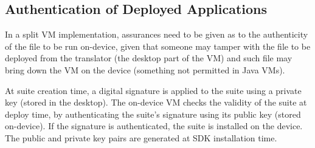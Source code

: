 \documentclass{sigplanconf}
\newcommand{\doublecenterfigbegin}{\begin{figure*}[htp] \begin{center}}
\newcommand{\doublecenterfigend}[2]{{\caption{\label{#1} {#2}}} \end{center} \end{figure*} }
\begin{document}
%
%
%        
%


\subsection{Authentication of Deployed Applications}
\label{sec-authentication}

In a split VM implementation, assurances need to be given 
as to the authenticity of the file to be run on-device, 
given that someone may tamper with the file to be deployed
from the translator (the desktop part of the VM) and such 
file may bring down the VM on the device (something not 
permitted in Java VMs). 

At suite creation time, a digital signature is applied to 
the suite using a private key (stored in the desktop).
The on-device VM checks the validity of the suite at 
deploy time, by authenticating the suite's signature using 
its public key (stored on-device).
If the signature is authenticated, the suite is installed
on the device. 
The public and private key pairs are generated at SDK 
installation time. 
\end{document}
